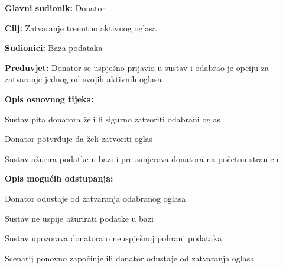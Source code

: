 					\noindent {}
					\begin{packed_item}
	
						\item \textbf{Glavni sudionik: }Donator
						\item  \textbf{Cilj:} Zatvaranje trenutno aktivnog oglasa
						\item  \textbf{Sudionici:} Baza podataka
						\item  \textbf{Preduvjet:} Donator se uspješno prijavio u sustav i odabrao je opciju za zatvaranje jednog od svojih aktivnih oglasa
						\item  \textbf{Opis osnovnog tijeka:}
						
						\item[] \begin{packed_enum}
							\item Sustav pita donatora želi li sigurno zatvoriti odabrani oglas
							\item Donator potvrđuje da želi zatvoriti oglas
							\item Sustav ažurira podatke u bazi i preusmjerava donatora na početnu stranicu
						\end{packed_enum}

						\item  \textbf{Opis mogućih odstupanja:}

						\item[] \begin{packed_item}
							\item[2.a] Donator odustaje od zatvaranja odabranog oglasa
							\item[3.a] Sustav ne uspije ažurirati podatke u bazi
							\item[] \begin{packed_enum}
								\item Sustav upozorava donatora o neuspješnoj pohrani podataka
								\item Scenarij ponovno započinje ili donator odustaje od zatvaranja oglasa
							\end{packed_enum}					
						\end{packed_item}
					\end{packed_item}

					\eject

